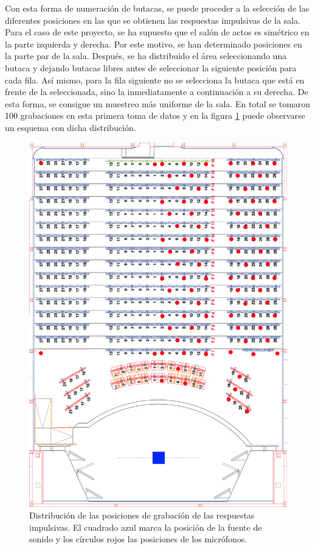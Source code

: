 \documentclass[11pt,a4paper]{book}
\begin{document}
		    Con esta forma de numeración de butacas, se puede proceder a la selección de las diferentes posiciones en las que se obtienen las respuestas impulsivas de la sala. Para el caso de este proyecto, se ha supuesto que el salón de actos es simétrico en la parte izquierda y derecha. Por este motivo, se han determinado posiciones en la parte par de la sala. Después, se ha distribuido el área seleccionando una butaca y dejando butacas libres antes de seleccionar la siguiente posición para cada fila. Así mismo, para la fila siguiente no se selecciona la butaca que está en frente de la seleccionada, sino la inmediatamente a continuación a su derecha. De esta forma, se consigue un muestreo más uniforme de la sala. En total se tomaron 100 grabaciones en esta primera toma de datos y en la figura \ref{fig:butacasMarcadas} puede observarse un esquema con dicha distribución. 
		
		    \begin{figure}
	            \includegraphics[scale=0.1]{../imagenes/auditorio_butacas_marcadas.png}
			    \centering
			    \caption{Distribución de las posiciones de grabación de las respuestas impulsivas. El cuadrado azul marca la posición de la fuente de sonido y los círculos rojos las posiciones de los micrófonos.}
			    \label{fig:butacasMarcadas}
	        \end{figure}
\end{document}
